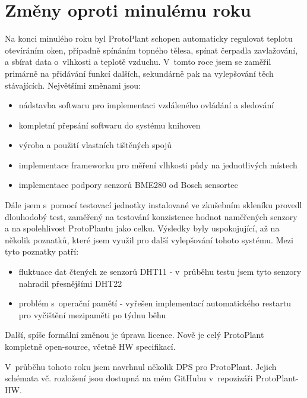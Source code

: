 \chapter{Změny oproti minulému roku}
Na konci minulého roku byl ProtoPlant schopen automaticky regulovat teplotu otevíráním oken, případně spínáním topného tělesa, spínat čerpadla zavlažování, a sbírat data o~vlhkosti a teplotě vzduchu. V~tomto roce jsem se zaměřil primárně na přidávání funkcí dalších, sekundárně pak na vylepšování těch stávajících.
Největšími změnami jsou: 
\begin{itemize}
    \item nádstavba softwaru pro implementaci vzdáleného ovládání a sledování
	\item kompletní přepsání softwaru do systému knihoven
	\item výroba a použití vlastních tištěných spojů
	\item implementace frameworku pro měření vlhkosti půdy na jednotlivých místech
	\item implementace podpory senzorů BME280 od Bosch sensortec
\end{itemize}

Dále jsem s~pomocí testovací jednotky instalované ve zkušebním skleníku provedl dlouhodobý test, zaměřený na testování konzistence hodnot naměřených senzory a na spolehlivost ProtoPlantu jako celku. Výsledky byly uspokojující, až na několik poznatků, které jsem využil pro další vylepšování tohoto systému. Mezi tyto poznatky patří:
\begin{itemize}
    \item fluktuace dat čtených ze senzorů DHT11 - v~průběhu testu jsem tyto senzory nahradil přesnějšími DHT22
    \item problém s~operační pamětí - vyřešen implementací automatického restartu pro vyčištění mezipaměti po týdnu běhu
\end{itemize}

Další, spíše formální změnou je úprava licence. Nově je celý ProtoPlant kompletně open-source, včetně HW specifikací.

V~průběhu tohoto roku jsem navrhnul několik DPS pro ProtoPlant. 
Jejich schémata vč. rozložení jsou dostupná na mém GitHubu v~repozizáři ProtoPlant-HW. 
\newpage